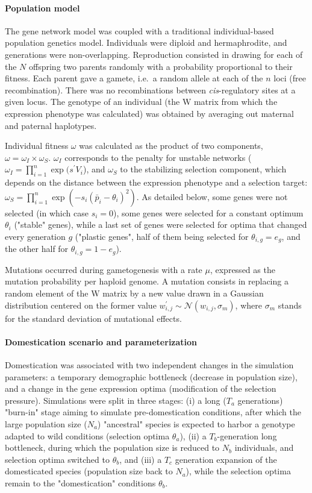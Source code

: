 \documentclass[12pt]{article}
\begin{document}
\paragraph{Population model}

The gene network model was coupled with a traditional individual-based population genetics model. Individuals were diploid and hermaphrodite, and generations were non-overlapping. Reproduction consisted in drawing for each of the $N$ offspring two parents randomly with a probability proportional to their fitness. Each parent gave a gamete, i.e.\ a random allele at each of the $n$ loci (free recombination). There was no recombinations between \emph{cis}-regulatory sites at a given locus. The genotype of an individual (the $\bm{\mathrm W}$ matrix from which the expression phenotype was calculated) was obtained by averaging out maternal and paternal haplotypes. 

Individual fitness $\omega$ was calculated as the product of two components, $\omega = \omega_I \times \omega_S$. $\omega_I$ corresponds to the penalty for unstable networks ($\omega_I = \prod_{i=1}^n \exp(s^\prime V_i$), and $\omega_S$ to the stabilizing selection component, which depends on the distance between the expression phenotype and a selection target: $\omega_S = \prod_{i=1}^n \exp(-s_i (\bar p_i - \theta_i)^2)$. As detailed below, some genes were not selected (in which case $s_i = 0$), some genes were selected for a constant optimum $\theta_i$ ("stable" genes), while a last set of genes were selected for optima that changed every generation $g$ ("plastic genes", half of them being selected for $\theta_{i,g} = e_g$, and the other half for $\theta_{i,g} = 1-e_g$).

Mutations occurred during gametogenesis with a rate $\mu$, expressed as the mutation probability per haploid genome. A mutation consists in replacing a random element of the $\bm{\mathrm W}$ matrix by a new value drawn in a Gaussian distribution centered on the former value $w_{i,j}^\prime \sim \mathcal N (w_{i,j}, \sigma_m)$, where $\sigma_m$ stands for the standard deviation of mutational effects. 

\paragraph{Domestication scenario and parameterization}

Domestication was associated with two independent changes in the simulation parameters: a temporary demographic bottleneck (decrease in population size), and a change in the gene expression optima (modification of the selection pressure). Simulations were split in three stages: (i) a long ($T_a$ generations) "burn-in" stage aiming to simulate pre-domestication conditions, after which the large population size ($N_a$) "ancestral" species is expected to harbor a genotype adapted to wild conditions (selection optima $\theta_a$), (ii) a $T_b$-generation long bottleneck, during which the population size is reduced to $N_b$ individuals, and selection optima switched to $\theta_b$, and (iii) a $T_c$ generation expansion of the domesticated species (population size back to $N_a$), while the selection optima remain to the "domestication" conditions $\theta_b$. 
\end{document}

